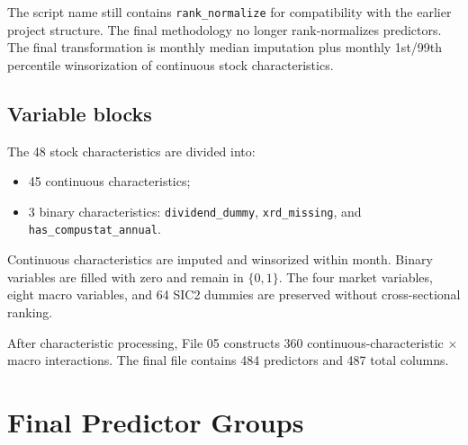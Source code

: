\documentclass[11pt,a4paper]{article}
\newcommand{\code}[1]{\texttt{#1}}
\begin{document}
The script name still contains \code{rank\_normalize} for compatibility with the earlier project structure. The final methodology no longer rank-normalizes predictors. The final transformation is monthly median imputation plus monthly 1st/99th percentile winsorization of continuous stock characteristics.

\subsection{Variable blocks}

The 48 stock characteristics are divided into:
\begin{itemize}
  \item 45 continuous characteristics;
  \item 3 binary characteristics: \code{dividend\_dummy}, \code{xrd\_missing}, and \code{has\_compustat\_annual}.
\end{itemize}

Continuous characteristics are imputed and winsorized within month. Binary variables are filled with zero and remain in $\{0,1\}$. The four market variables, eight macro variables, and 64 SIC2 dummies are preserved without cross-sectional ranking.

After characteristic processing, File 05 constructs 360 continuous-characteristic $\times$ macro interactions. The final file contains 484 predictors and 487 total columns.

\section{Final Predictor Groups}
\end{document}
